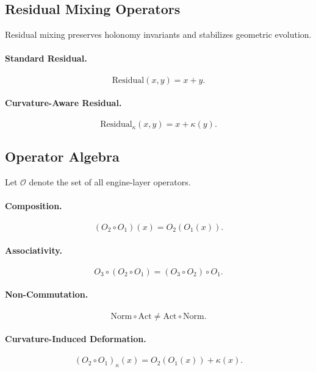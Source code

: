 \documentclass[11pt]{article}
\begin{document}
\subsection{Residual Mixing Operators}

Residual mixing preserves holonomy invariants and stabilizes geometric evolution.

\paragraph{Standard Residual.}
\[
\mathrm{Residual}(x, y) = x + y.
\]

\paragraph{Curvature-Aware Residual.}
\[
\mathrm{Residual}_{\kappa}(x, y) = x + \kappa(y).
\]

\subsection{Operator Algebra}

Let $\mathcal{O}$ denote the set of all engine-layer operators.

\paragraph{Composition.}
\[
(O_2 \circ O_1)(x) = O_2(O_1(x)).
\]

\paragraph{Associativity.}
\[
O_3 \circ (O_2 \circ O_1) = (O_3 \circ O_2) \circ O_1.
\]

\paragraph{Non-Commutation.}
\[
\mathrm{Norm} \circ \mathrm{Act} \ne \mathrm{Act} \circ \mathrm{Norm}.
\]

\paragraph{Curvature-Induced Deformation.}
\[
(O_2 \circ O_1)_{\kappa}(x)
= O_2(O_1(x)) + \kappa(x).
\]

\end{document}
